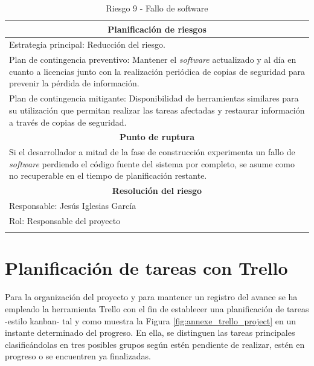 \documentclass[12pt,a4paper, twoside]{report}
\begin{document}
\begin{longtable}{m{4cm}|m{5cm}|m{4cm}}
		\multicolumn{3}{|c|}{\textbf{Planificación de riesgos}} \\ \hline \hline
		\multicolumn{3}{|p{17cm}|}{Estrategia principal: Reducción del riesgo.} \\ \hline
		\multicolumn{3}{|p{17cm}|}{Plan de contingencia preventivo: Mantener el \textit{software} actualizado y al día en cuanto a licencias junto con la realización periódica de copias de seguridad para prevenir la pérdida de información.} \\ \hline
		\multicolumn{3}{|p{17cm}|}{Plan de contingencia mitigante: Disponibilidad de herramientas similares para su utilización que permitan realizar las tareas afectadas y restaurar información a través de copias de seguridad.} \\ \hline
			
		\multicolumn{3}{|c|}{\textbf{Punto de ruptura}} \\ \hline \hline
		\multicolumn{3}{|p{17cm}|}{Si el desarrollador a mitad de la fase de construcción experimenta un fallo de \textit{software} perdiendo el código fuente del sistema por completo, se asume como no recuperable en el tiempo de planificación restante.}\\ \hline
			
		\multicolumn{3}{|c|}{\textbf{Resolución del riesgo}} \\ \hline \hline
		\multicolumn{3}{|p{17cm}|}{Responsable: Jesús Iglesias García}\\ \hline
		\multicolumn{3}{|p{17cm}|}{Rol: Responsable del proyecto} \\ \hline
		\caption{Riesgo 9 - Fallo de software}	
	\end{longtable}
	
	\chapter{Planificación de tareas con Trello}\label{trello}
	
	Para la organización del proyecto y para mantener un registro del avance se ha empleado la herramienta Trello con el fin de establecer una planificación de tareas -estilo \gls{kanban}- tal y como muestra la Figura \ref{fig:annexe_trello_project} en un instante determinado del progreso. En ella, se distinguen las tareas principales clasificándolas en tres posibles grupos según estén pendiente de realizar, estén en progreso o se encuentren ya finalizadas. 
	
		
\end{document}
